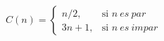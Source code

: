 \documentclass[preview]{standalone}
\begin{document}
\begin{align*}
C(n) = \begin{cases} n/2, & \text{si } n \ es \ par \\ 3n+1, & \text{si } n \ es \ impar \end{cases}
\end{align*}
\end{document}
